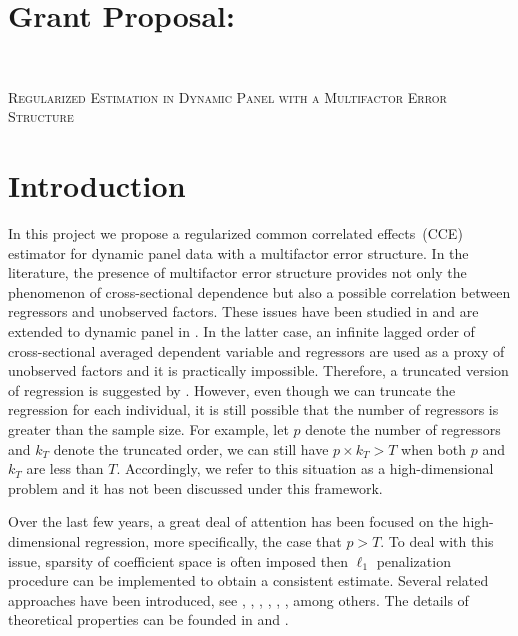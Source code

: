 \documentclass[11pt,a4paper]{article}
\theoremstyle{definition}
\begin{document}
\section*{Grant Proposal:}
\\
\begin{center}
{\large{\scshape Regularized Estimation in Dynamic Panel with a Multifactor Error Structure}}
\end{center}
\baselineskip=18pt
\parskip=4pt

\section{Introduction}\label{Sec:Intro}
In this project we propose a regularized common correlated effects~(CCE) estimator for dynamic panel data with a multifactor error structure. In the literature, the presence of multifactor error structure provides not only the phenomenon of cross-sectional dependence but also a possible correlation between regressors and unobserved factors. These issues have been studied in \citet{Pesaran2006} and are extended to dynamic panel in \citet{Chudik2015}. In the latter case, an infinite lagged order of cross-sectional averaged dependent variable and regressors are used as a proxy of unobserved factors and it is practically impossible. Therefore, a truncated version of regression is suggested by \citet{Chudik2015}. However, even though we can truncate the regression for each individual, it is still possible that the number of regressors is greater than the sample size. For example, let $p$ denote the number of regressors and $k_T$ denote the truncated order, we can still have $p\times k_T>T$ when both $p$ and $k_T$ are less than $T$. Accordingly, we refer to this situation as a high-dimensional problem and it has not been discussed under this framework.

Over the last few years, a great deal of attention has been focused on the high-dimensional regression, more specifically, the case that $p>T$. To deal with this issue, sparsity of coefficient space is often imposed then $\ell_1$ penalization procedure can be implemented to obtain a consistent estimate. Several related approaches have been introduced, see \citet{Efron2004}, \citet{Zhao2006}, \citet{Candes2007}, \citet{Zou2006}, \citet{Yuan2006}, \citet{Fan2001}, among others. The details of theoretical properties can be founded in \citet{Bickel2009} and \citet{buhlmann2011statistics}.
\end{document}
